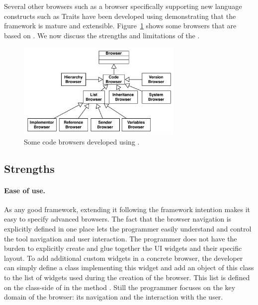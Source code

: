 \documentclass[a4paper,10pt,twoside]{book}
\begin{document}
Several other browsers such as a browser specifically supporting new language constructs such as Traits have been developed using \obf demonstrating that the framework is mature and extensible. Figure~\ref{browsers} shows some browsers that are based on \obf.
 We now discuss the strengths and limitations of the \obf.



\begin{figure}
\begin{center}
\includegraphics[width=8cm]{BrowserFamily}
\caption{Some code browsers developed using \obf.}\label{browsers}
\end{center}
\end{figure}


\subsection{Strengths}

\paragraph{Ease of use.}
As any good framework, extending it following the framework intention makes it easy to specify advanced browsers. The fact that the browser navigation is explicitly defined in one place lets the programmer easily understand and control the tool navigation and user interaction. The programmer does not have the burden to explicitly create and glue together the UI widgets and their specific layout. To add additional custom widgets in a concrete browser, the developer can simply define a class implementing this widget and add an object of this class to the list of widgets used during the creation of the browser. This list is defined on the class-side of  in the method . Still the programmer focuses on the key domain of the browser: its navigation and the interaction with the user. 
\end{document}
